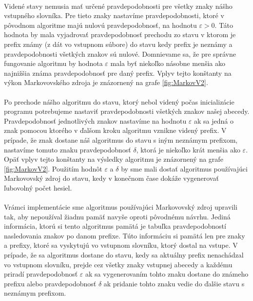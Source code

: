 \paragraph{}
Videné stavy nemusia mať určené pravdepodobnosti pre všetky znaky nášho vstupného slovníka. Pre tieto znaky nastavíme pravdepodobnosti, ktoré v pôvodnom algoritme majú nulovú pravdepodobnosť, na hodnotu \(\varepsilon > 0\). Táto hodnota by mala vyjadrovať pravdepodobnosť prechodu zo stavu v ktorom je prefix známy (z dát vo vstupnom súbore) do stavu kedy prefix je neznámy a pravdepodobnosti všetkých znakov sú nulové. Domnievame sa, že pre správne fungovanie algoritmu by hodnota \(\varepsilon\) mala byť niekoľko násobne menšia ako najnižšia známa pravdepodobnosť pre daný prefix. Vplyv tejto konštanty na výkon Markovovského zdroja je znázornený na grafe \ref{fig:MarkovV2}.

\paragraph{}
Po prechode nášho algoritmu do stavu, ktorý nebol videný počas inicializácie programu potrebujeme nastaviť pravdepodobnosti všetkých znakov našej abecedy. Pravdepodobnosť jednotlivých znakov nastavíme na hodnotu \(\varepsilon\) ak sa jedná o znak pomocou ktorého v ďalšom kroku algoritmu vznikne videný prefix. V prípade, že znak dostane náš algoritmus do stavu s iným neznámym prefixom, nastavíme tomuto znaku pravdepodobnosť \(\delta\), ktorá je niekoľko krát menšia ako \(\varepsilon\). Opäť vplyv tejto konštanty na výsledky algoritmu je znázornený na grafe \ref{fig:MarkovV2}. Použitím hodnôt \(\varepsilon\) a \(\delta\) by sme mali dostať algoritmus používajúci Markovovský zdroj do stavu, kedy v konečnom čase dokáže vygenerovať ľubovolný počet hesiel.

\paragraph{}
Vrámci implementácie sme algoritmus používajúci Markovovský zdroj upravili tak, aby nepoužíval žiadnu pamäť navyše oproti pôvodnému návrhu. Jediná informácia, ktorú si tento algoritmus pamätá je tabuľka pravdepodobností nasledovania znakov po danom prefixe. Túto informáciu si pamätá len pre znaky a prefixy, ktoré sa vyskytujú vo vstupnom slovníku, ktorý dostal na vstupe. V prípade, že sa algoritmus dostane do stavu, kedy sa aktuálny prefix nenachádzal vo vstupnom slovníku, prejde cez všetky znaky vstupnej abecedy a každému priradí pravdepodobnosť \(\varepsilon\) ak sa vygenerovaním tohto znaku dostane do známeho prefixu alebo pravdepodobnosť \(\delta\) ak pridanie tohto znaku vedie do ďalšie stavu s neznámym prefixom.

